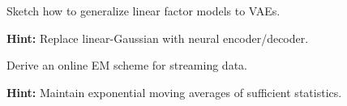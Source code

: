 \begin{problem}
Sketch how to generalize linear factor models to VAEs.

\textbf{Hint:} Replace linear-Gaussian with neural encoder/decoder.
\end{problem}

\begin{problem}[Online EM]
Derive an online EM scheme for streaming data.

\textbf{Hint:} Maintain exponential moving averages of sufficient statistics.
\end{problem}


